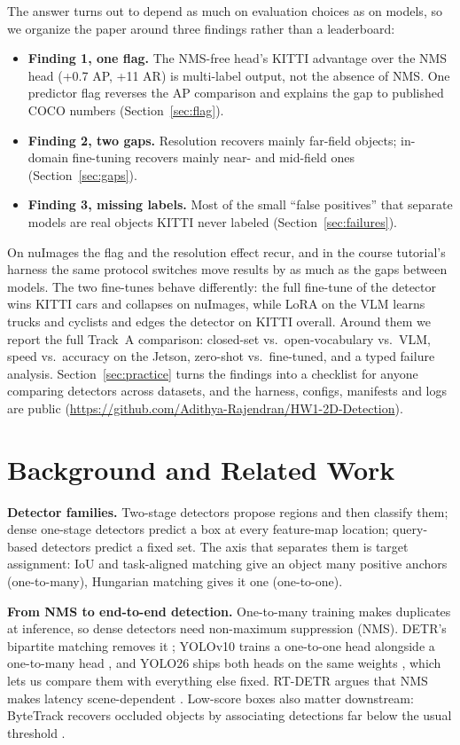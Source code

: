\documentclass[conference]{IEEEtran}
\newcommand{\repourl}{\url{https://github.com/Adithya-Rajendran/HW1-2D-Detection}}
\begin{document}
The answer turns out to depend as much on evaluation choices as on models, so we organize the paper around three
findings rather than a leaderboard:
\begin{itemize}
  \item \textbf{Finding 1, one flag.} The NMS-free head's KITTI advantage over the NMS head (+0.7 AP, +11 AR) is
  multi-label output, not the absence of NMS. One predictor flag reverses the AP comparison and explains the gap to
  published COCO numbers (Section~\ref{sec:flag}).
  \item \textbf{Finding 2, two gaps.} Resolution recovers mainly far-field objects; in-domain fine-tuning recovers
  mainly near- and mid-field ones (Section~\ref{sec:gaps}).
  \item \textbf{Finding 3, missing labels.} Most of the small ``false positives'' that separate models are real
  objects KITTI never labeled (Section~\ref{sec:failures}).
\end{itemize}
On nuImages the flag and the resolution effect recur, and in the course tutorial's harness the same protocol switches
move results by as much as the gaps between models. The two fine-tunes behave differently: the full fine-tune of the
detector wins KITTI cars and collapses on nuImages, while LoRA on the VLM learns trucks and cyclists and edges the
detector on KITTI overall.
Around them we report the full Track~A comparison: closed-set vs.\ open-vocabulary vs.\ VLM, speed vs.\ accuracy on
the Jetson, zero-shot vs.\ fine-tuned, and a typed failure analysis. Section~\ref{sec:practice} turns the findings
into a checklist for anyone comparing detectors across datasets, and the harness, configs, manifests and logs are
public (\repourl).

\section{Background and Related Work}
\textbf{Detector families.} Two-stage detectors \cite{ren2015faster} propose regions and then classify them; dense
one-stage detectors \cite{redmon2016yolo} predict a box at every feature-map location; query-based detectors
\cite{carion2020detr,zhu2021deformable,zhao2024rtdetr} predict a fixed set. The axis that separates them is target
assignment: IoU and task-aligned matching give an object many positive anchors (one-to-many), Hungarian matching
gives it one (one-to-one).

\textbf{From NMS to end-to-end detection.} One-to-many training makes duplicates at inference, so dense detectors
need non-maximum suppression (NMS). DETR's bipartite matching removes it \cite{carion2020detr}; YOLOv10 trains a
one-to-one head alongside a one-to-many head \cite{wang2024yolov10}, and YOLO26 ships both heads on the same weights
\cite{yolo26docs}, which lets us compare them with everything else fixed. RT-DETR argues that NMS makes latency
scene-dependent \cite{zhao2024rtdetr}. Low-score boxes also matter downstream: ByteTrack recovers occluded objects
by associating detections far below the usual threshold \cite{zhang2022bytetrack}.
\end{document}
